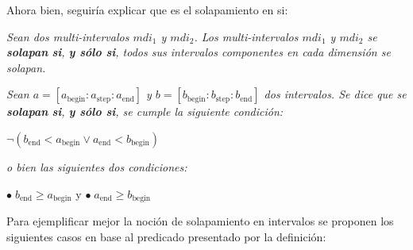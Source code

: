Ahora bien, seguiría explicar que es el solapamiento en si:

\begin{center}
    \textit{Sean dos multi-intervalos $mdi_1$ y $mdi_2$. Los multi-intervalos $mdi_1$ y $mdi_2$ se \textbf{solapan} \textbf{si}, \textbf{y sólo si}, todos sus intervalos componentes en cada dimensión se solapan.}

    \textit{Sean $a = [a_{\text{begin}} : a_{\text{step}} : a_{\text{end}}]$ y $b = [b_{\text{begin}} : b_{\text{step}} : b_{\text{end}}]$ dos intervalos. Se dice que se \textbf{solapan} \textbf{si}, \textbf{y sólo si}, se cumple la siguiente condición:}

$\neg (b_{\text{end}} < a_{\text{begin}} \lor a_{\text{end}} < b_{\text{begin}})$

\textit{o bien las siguientes dos condiciones:}

$\bullet \;b_{\text{end}} \geq a_{\text{begin}}$ y $\bullet \;a_{\text{end}} \geq b_{\text{begin}}$

\end{center}

Para ejemplificar mejor la noción de solapamiento en intervalos se proponen los siguientes casos en base al predicado presentado por la definición:


